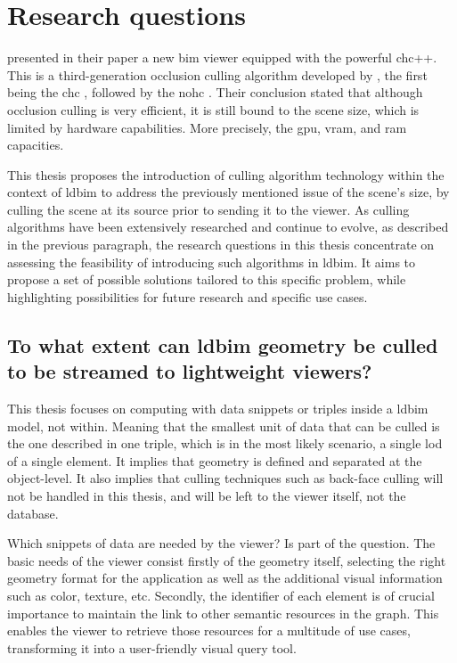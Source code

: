 \section{Research questions}\label{sec:researchQuestions}
\cite{Johansson2015} presented in their paper a new \ac{bim} viewer equipped with the powerful \ac{chc}++. This is a third-generation occlusion culling algorithm developed by \cite{Mattausch2008}, the first being the \ac{chc} \parencite{Bittner2004}, followed by the \ac{nohc} \parencite{Michael2006}. Their conclusion stated that although occlusion culling is very efficient, it is still bound to the scene size, which is limited by hardware capabilities. More precisely, the \ac{gpu}, \ac{vram}, and \ac{ram} capacities.

This thesis proposes the introduction of culling algorithm technology within the context of \ac{ldbim} to address the previously mentioned issue of the scene's size, by culling the scene at its source prior to sending it to the viewer. As culling algorithms have been extensively researched and continue to evolve, as described in the previous paragraph, the research questions in this thesis concentrate on assessing the feasibility of introducing such algorithms in \ac{ldbim}. It aims to propose a set of possible solutions tailored to this specific problem, while highlighting possibilities for future research and specific use cases.

\subsection[Can \acs{ldbim} be culled?]{To what extent can \acs{ldbim} geometry be culled \\
	to be streamed to lightweight viewers?}
This thesis focuses on computing with data snippets or triples inside a \ac{ldbim} model, not within. Meaning that the smallest unit of data that can be culled is the one described in one triple, which is in the most likely scenario, a single \ac{lod} of a single element. It implies that geometry is defined and separated at the object-level. It also implies that culling techniques such as back-face culling will not be handled in this thesis, and will be left to the viewer itself, not the database.

Which snippets of data are needed by the viewer? Is part of the question. The basic needs of the viewer consist firstly of the geometry itself, selecting the right geometry format for the application as well as the additional visual information such as color, texture, etc. Secondly, the identifier of each element is of crucial importance to maintain the link to other semantic resources in the graph. This enables the viewer to retrieve those resources for a multitude of use cases, transforming it into a user-friendly visual query tool.

